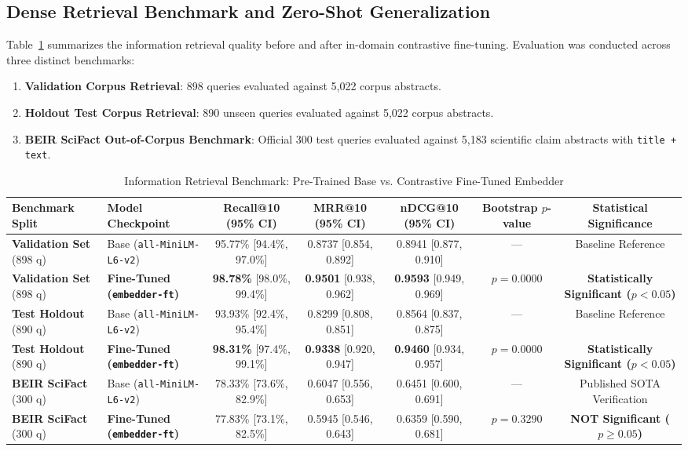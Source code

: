 \documentclass[journal]{IEEEtran}
\begin{document}
\subsection{Dense Retrieval Benchmark and Zero-Shot Generalization}
Table~\ref{tab:retrieval} summarizes the information retrieval quality before and after in-domain contrastive fine-tuning. Evaluation was conducted across three distinct benchmarks:
\begin{enumerate}
    \item \textbf{Validation Corpus Retrieval}: 898 queries evaluated against 5,022 corpus abstracts.
    \item \textbf{Holdout Test Corpus Retrieval}: 890 unseen queries evaluated against 5,022 corpus abstracts.
    \item \textbf{BEIR SciFact Out-of-Corpus Benchmark}: Official 300 test queries evaluated against 5,183 scientific claim abstracts with \texttt{title + text}.
\end{enumerate}

\begin{table}[t]
\caption{Information Retrieval Benchmark: Pre-Trained Base vs. Contrastive Fine-Tuned Embedder}
\label{tab:retrieval}
\centering
\small
\begin{tabular}{llccccc}
\toprule
\textbf{Benchmark Split} & \textbf{Model Checkpoint} & \textbf{Recall@10 (95\% CI)} & \textbf{MRR@10 (95\% CI)} & \textbf{nDCG@10 (95\% CI)} & \textbf{Bootstrap $p$-value} & \textbf{Statistical Significance} \\
\midrule
\textbf{Validation Set} (898 q) & Base (\texttt{all-MiniLM-L6-v2}) & 95.77\% [94.4\%, 97.0\%] & 0.8737 [0.854, 0.892] & 0.8941 [0.877, 0.910] & --- & Baseline Reference \\
\textbf{Validation Set} (898 q) & \textbf{Fine-Tuned (\texttt{embedder-ft})} & \textbf{98.78\%} [98.0\%, 99.4\%] & \textbf{0.9501} [0.938, 0.962] & \textbf{0.9593} [0.949, 0.969] & \textbf{$p = 0.0000$} & \textbf{Statistically Significant ($p < 0.05$)} \\
\midrule
\textbf{Test Holdout} (890 q) & Base (\texttt{all-MiniLM-L6-v2}) & 93.93\% [92.4\%, 95.4\%] & 0.8299 [0.808, 0.851] & 0.8564 [0.837, 0.875] & --- & Baseline Reference \\
\textbf{Test Holdout} (890 q) & \textbf{Fine-Tuned (\texttt{embedder-ft})} & \textbf{98.31\%} [97.4\%, 99.1\%] & \textbf{0.9338} [0.920, 0.947] & \textbf{0.9460} [0.934, 0.957] & \textbf{$p = 0.0000$} & \textbf{Statistically Significant ($p < 0.05$)} \\
\midrule
\textbf{BEIR SciFact} (300 q) & Base (\texttt{all-MiniLM-L6-v2}) & 78.33\% [73.6\%, 82.9\%] & 0.6047 [0.556, 0.653] & 0.6451 [0.600, 0.691] & --- & Published SOTA Verification \\
\textbf{BEIR SciFact} (300 q) & \textbf{Fine-Tuned (\texttt{embedder-ft})} & 77.83\% [73.1\%, 82.5\%] & 0.5945 [0.546, 0.643] & 0.6359 [0.590, 0.681] & \textbf{$p = 0.3290$} & \textbf{NOT Significant ($p \ge 0.05$)} \\
\bottomrule
\end{tabular}
\end{table}
\end{document}

